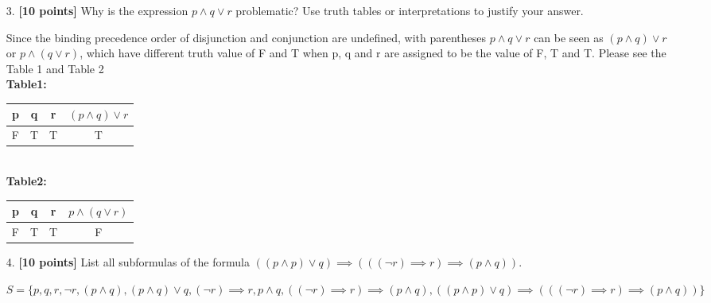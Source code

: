 \documentclass{article}
\begin{document}
\begin{enumerate}
\item[3.] \textbf{[10 points]} Why is the expression $p \land q \lor r$
  problematic?  Use truth tables or interpretations to justify your
  answer.
  
  \begin{answer}
      Since the binding precedence order of disjunction and conjunction are undefined, with parentheses $p \land q \lor r$ can be seen as  $ (p \land q) \lor r$ or $p \land (q \lor r)$, which have different truth value of F and T when p, q and r are assigned to be the value of F, T and T. Please see the Table 1 and Table 2\\
    \textbf{Table1:} \\
      \begin{tabular}{|c|c|c|c|}\hline
       p & q & r &  $(p \land q) \lor r$   \\ \hline
       F & T & T & T \\\hline
      \end{tabular} \\
    \textbf{Table2:}\\
      \begin{tabular}{|c|c|c|c|}\hline
       p & q & r &  $p \land (q \lor r)$   \\ \hline
       F & T & T & F \\\hline
      \end{tabular}
  \end{answer}
  
\end{enumerate}

\begin{enumerate}
\item[4.] \textbf{[10 points]} List all subformulas of the formula
  $((p \land p) \lor q) \implies (((\neg r) \implies r) \implies (p
  \land q))$.
  
   \begin{answer}
       $S=\{p,q,r,\neg r, (p \land q), (p \land q) \lor q, (\neg r)\implies r, p \land q,((\neg r)\implies r) \implies (p \land q), ((p \land p) \lor q) \implies (((\neg r) \implies r) \implies (p
      \land q))\}$
  \end{answer}
  
\end{enumerate}
\end{document}
